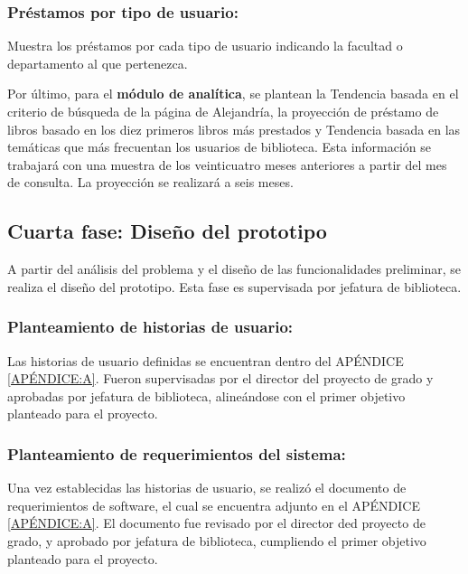 \documentclass[spanish]{ieee_upb}
\begin{document}
\subsubsection{Préstamos por tipo de usuario:} Muestra los préstamos por cada tipo de usuario indicando la facultad o departamento al que pertenezca.

\vspace{0.3cm}
Por último, para el \textbf{módulo de analítica}, se plantean la Tendencia basada en el criterio de búsqueda de la página de Alejandría, la proyección de préstamo de libros basado en los diez primeros libros más prestados y Tendencia basada en las temáticas que más frecuentan los usuarios de biblioteca. Esta información se trabajará con una muestra de los veinticuatro meses anteriores a partir del mes de consulta. La proyección se realizará a seis meses.

\vspace{0.3cm}
\subsection{Cuarta fase: Diseño del prototipo}

A partir del análisis del problema y el diseño de las funcionalidades preliminar, se realiza el diseño del prototipo. Esta fase es supervisada por jefatura de biblioteca.

\subsubsection{Planteamiento de historias de usuario: }

Las historias de usuario definidas se encuentran dentro del APÉNDICE \ref{APÉNDICE:A}. Fueron supervisadas por el director del proyecto de grado y aprobadas por jefatura de biblioteca, alineándose con el primer objetivo planteado para el proyecto.

\subsubsection{Planteamiento de requerimientos del sistema: }

Una vez establecidas las historias de usuario, se realizó el documento de requerimientos de software, el cual se encuentra adjunto en el APÉNDICE \ref{APÉNDICE:A}. El documento fue revisado por el director ded proyecto de grado, y aprobado por jefatura de biblioteca, cumpliendo el primer objetivo planteado para el proyecto. 
\end{document}

